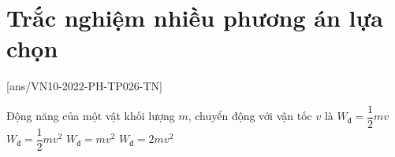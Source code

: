 \let\lesson\undefined
\newcommand{\lesson}{\phantomlesson{Bài 17.}}
\setcounter{section}{2}
\section{Trắc nghiệm nhiều phương án lựa chọn}
\setcounter{ex}{0}
[ans/VN10-2022-PH-TP026-TN]
\begin{ex}
	Động năng của một vật khối lượng $m$, chuyển động với vận tốc $v$ là
	\choice
	{$W_\text{đ} = \dfrac{1}{2}mv$}
	{\True $W_\text{đ} = \dfrac{1}{2}mv^2$}
	{$W_\text{đ} = mv^2$}
	{$W_\text{đ} = 2mv^2$}
\end{ex}

